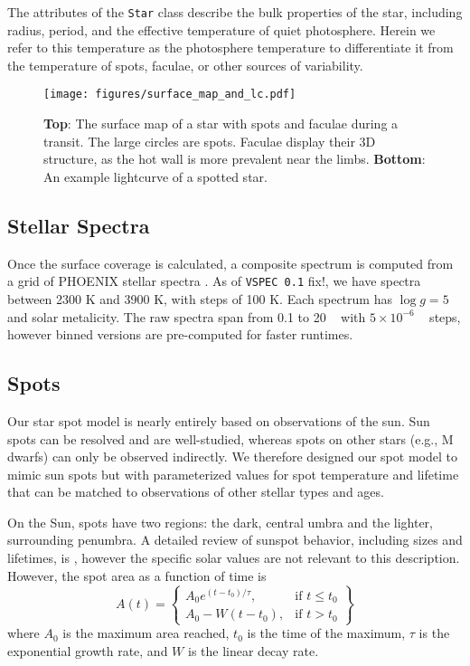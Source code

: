 \documentclass[twocolumn]{aastex631}
\newcommand{\TJ}[1]{\textcolor{tedcommentcolor}{#1}}
\begin{document}
The attributes of the \texttt{Star} class describe the bulk properties of the star, including radius,
period, and the effective temperature of quiet photosphere. Herein we refer to this temperature as the
photosphere temperature to differentiate it from the temperature of spots, faculae, or other sources of variability.

\begin{figure}
    \centering
        \texttt{[image: figures/surface\_map\_and\_lc.pdf]}
    \caption{{\bf Top}: The surface map of a star with spots and faculae during a transit.
    The large circles are spots. Faculae display their 3D structure, as the hot wall is more prevalent near the limbs.
    {\bf Bottom}: An example lightcurve of a spotted star.}
    \label{fig:surface_map}
\end{figure}

\subsection{Stellar Spectra \label{subsec:spectra}}
Once the surface coverage is calculated, a composite spectrum is computed from a grid of PHOENIX stellar spectra
\citep{husser2013}.
As of \texttt{VSPEC 0.1} \TJ{fix!}, we have spectra between 2300 K and 3900 K, with steps of
100 K. Each spectrum has $\log{g} = 5$ and solar metalicity.
The raw spectra span from 0.1 to 20 \micron~ with $5 \times 10^{-6}$ \micron~ steps, however binned
versions are pre-computed for faster runtimes.

\subsection{Spots \label{subsec:spots}}
Our star spot model is nearly entirely based on observations of the sun. Sun spots can be resolved and are well-studied,
whereas spots on other stars (e.g., M dwarfs) can only be observed indirectly. We therefore designed our spot model to mimic
sun spots but with parameterized values for spot temperature and lifetime that can be matched to observations of other stellar types and ages.


On the Sun, spots have two regions: the dark, central umbra and the lighter, surrounding penumbra. A detailed review of sunspot behavior,
including sizes and lifetimes, is \citet{solanki2003}, however the specific solar values are not relevant to this description. However,
the spot area as a function of time is
\begin{equation}
    A(t) = \left\{
    \begin{array}{lr}
        A_0 e^{(t-t_0)/\tau}, & \text{if } t \leq t_0 \\
        A_0 - W(t-t_0), & \text{if } t > t_0
    \end{array}
    \right\}
\end{equation}
where $A_0$ is the maximum area reached, $t_0$ is the time of the maximum, $\tau$ is the exponential growth rate, and $W$ is the linear decay rate.
\end{document}
